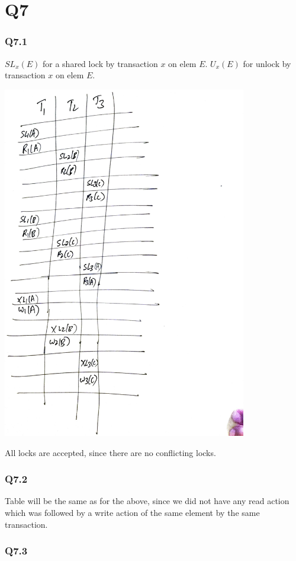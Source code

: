 \documentclass{article}
\begin{document}
\section{Q7}
\subsubsection{Q7.1}
$SL_x(E)$ for a shared lock by transaction $x$ on elem $E$. $U_x(E)$ for
unlock by transaction $x$ on elem $E$.

\includegraphics[width=0.8\textwidth]{db-q71.pdf}

All locks are accepted, since there are no conflicting locks.

\subsubsection{Q7.2}

Table will be the same as for the above, since we did not have any read action
which was followed by a write action of the same element by the same
transaction.


\subsubsection{Q7.3}
\end{document}
